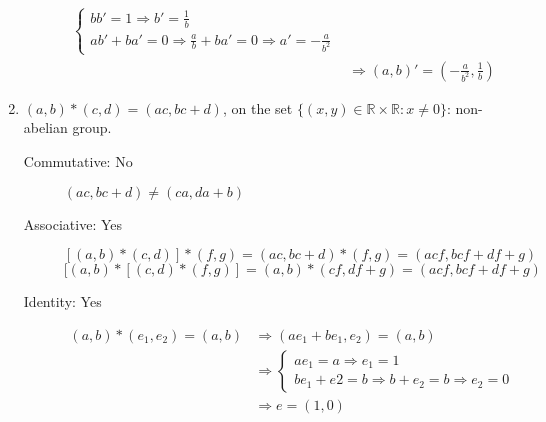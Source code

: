 \begin{enumerate}
\begin{description}
\begin{equation*}
\begin{split}
\begin{cases}
                                                                                            bb' = 1 \Rightarrow b' = \frac{1}{b} \\
                                                                                            ab' + ba' = 0 \Rightarrow \frac{a}{b} + ba' = 0 \Rightarrow a' = -\frac{a}{b^2}
                                                                                     \end{cases} \\
                                                                       & \Rightarrow (a, b)' = \left(-\frac{a}{b^2}, \frac{1}{b}\right)
                    \end{split}
                \end{equation*}
        \end{description}
    \item $(a, b) * (c, d) = (ac, bc + d)$, on the set $\{(x, y) \in \mathbb{R} \times \mathbb{R}: x \ne 0\}$: non-abelian group.
        \begin{description}
            \item [Commutative: No] $(ac, bc + d) \ne (ca, da + b)$
            \item [Associative: Yes]
                $$[(a, b) * (c, d)] * (f, g) = (ac, bc + d) * (f, g) = (acf, bcf + df + g)$$
                $$[(a, b) * [(c, d) * (f, g)] = (a, b) * (cf, df + g) = (acf, bcf + df + g)$$
            \item [Identity: Yes]
                \begin{equation*}
                    \begin{split}
                        (a, b) * (e_1, e_2) = (a, b) & \Rightarrow (ae_1 + be_1, e_2) = (a, b) \\
                                                    & \Rightarrow  \begin{cases}
                                                                        ae_1 = a \Rightarrow e_1 = 1 \\
                                                                        be_1 + e2 = b \Rightarrow b + e_2 = b \Rightarrow e_2 = 0
                                                                   \end{cases} \\
                                                    & \Rightarrow e = (1, 0)
                    \end{split}
                \end{equation*}

\end{description}
\end{enumerate}

